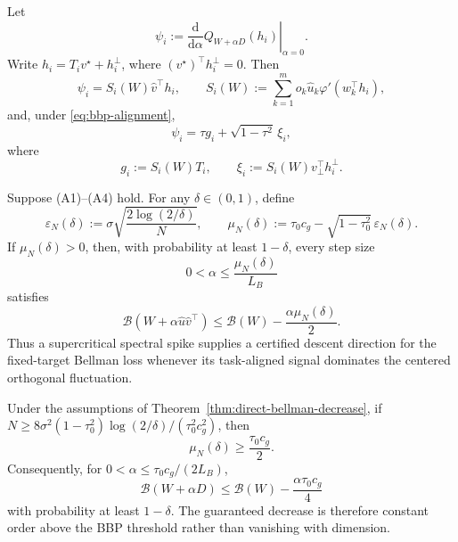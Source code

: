 \begin{lemma}
\label{lem:spike-feature}
Let
\begin{equation}
    \psi_i:=\left.\frac{\mathrm d}{\mathrm d\alpha}
    Q_{W+\alpha D}(h_i)\right|_{\alpha=0}.
\end{equation}
Write $h_i=T_i v^\star+h_i^\perp$, where
$(v^\star)^\top h_i^\perp=0$.  Then
\begin{equation}
    \psi_i=S_i(W)\hat v^\top h_i,
    \qquad
    S_i(W):=\sum_{k=1}^m o_k\hat u_k\varphi'(w_k^\top h_i),
    \label{eq:exact-tangent-feature}
\end{equation}
and, under \eqref{eq:bbp-alignment},
\begin{equation}
    \psi_i=\tau g_i+\sqrt{1-\tau^2}\,\xi_i,
    \label{eq:signal-noise-feature}
\end{equation}
where
\begin{equation}
    g_i:=S_i(W)T_i,
    \qquad
    \xi_i:=S_i(W)v_\perp^\top h_i^\perp.
\end{equation}
\end{lemma}

\begin{theorem}
\label{thm:direct-bellman-decrease}
Suppose (A1)--(A4) hold.  For any $\delta\in(0,1)$, define
\begin{equation}
    \varepsilon_N(\delta)
    :=\sigma\sqrt{\frac{2\log(2/\delta)}{N}},
    \qquad
    \mu_N(\delta)
    :=\tau_0c_g-\sqrt{1-\tau_0^2}\,\varepsilon_N(\delta).
    \label{eq:descent-margin}
\end{equation}
If $\mu_N(\delta)>0$, then, with probability at least $1-\delta$,
every step size
\begin{equation}
    0<\alpha\le\frac{\mu_N(\delta)}{L_B}
    \label{eq:valid-step}
\end{equation}
satisfies
\begin{equation}
    \boxed{
    \mathcal B(W+\alpha\hat u\hat v^\top)
    \le
    \mathcal B(W)-\frac{\alpha\mu_N(\delta)}{2}.}
    \label{eq:main-decrease}
\end{equation}
Thus a supercritical spectral spike supplies a certified descent direction for
the fixed-target Bellman loss whenever its task-aligned signal dominates the
centered orthogonal fluctuation.
\end{theorem}

\begin{corollary}
\label{cor:constant-gain}
Under the assumptions of Theorem~\ref{thm:direct-bellman-decrease}, if
$N\ge 8\sigma^2(1-\tau_0^2)\log(2/\delta)/(\tau_0^2c_g^2)$, then
\begin{equation}
    \mu_N(\delta)\ge\frac{\tau_0c_g}{2}.
\end{equation}
Consequently, for
$0<\alpha\le\tau_0c_g/(2L_B)$,
\begin{equation}
    \mathcal B(W+\alpha D)
    \le \mathcal B(W)-\frac{\alpha\tau_0c_g}{4}
\end{equation}
with probability at least $1-\delta$.  The guaranteed decrease is therefore
constant order above the BBP threshold rather than vanishing with dimension.
\end{corollary}

